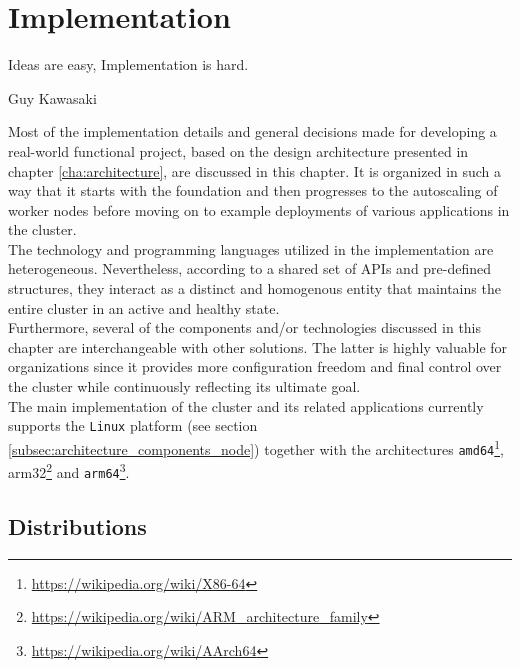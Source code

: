 \chapter{Implementation}
\label{cha:implementation}

\epigraph{Ideas are easy, Implementation is hard.}{Guy Kawasaki}

Most of the implementation details and general decisions made for developing a
real-world functional project, based on the design architecture presented in chapter
\ref{cha:architecture}, are discussed in this chapter. It is organized in such a
way that it starts with the foundation and then progresses to the autoscaling of
worker nodes before moving on to example deployments of various applications in the
cluster. \\ %
The technology and programming languages utilized in the implementation are heterogeneous.
Nevertheless, according to a shared set of APIs and pre-defined structures, they
interact as a distinct and homogenous entity that maintains the entire cluster
in an active and healthy state. \\ %
Furthermore, several of the components and/or technologies discussed in this chapter
are interchangeable with other solutions. The latter is highly valuable for
organizations since it provides more configuration freedom and final control
over the cluster while continuously reflecting its ultimate goal. \\ %
The main implementation of the cluster and its related applications currently
supports the \texttt{Linux} platform (see section
\ref{subsec:architecture_components_node}) together with the architectures \texttt{amd64}\footnote{\url{https://wikipedia.org/wiki/X86-64}},
arm32\footnote{\url{https://wikipedia.org/wiki/ARM_architecture_family}} and \texttt{arm64}\footnote{\url{https://wikipedia.org/wiki/AArch64}}.

\section{Distributions}
\label{sec:implementation_distributions}


